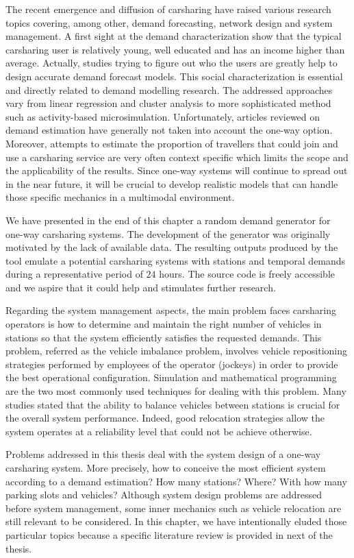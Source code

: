 \medskip
The recent emergence and diffusion of carsharing have raised various research topics covering, among other, demand forecasting, network design and system management.
A first sight at the demand characterization show that the typical carsharing user is relatively young, well educated and has an income higher than average.
Actually, studies trying to figure out who the users are greatly help to design accurate demand forecast models.
This social characterization is essential and directly related to demand modelling research.
The addressed approaches vary from linear regression and cluster analysis to more sophisticated method such as activity-based microsimulation.
Unfortunately, articles reviewed on demand estimation have generally not taken into account the one-way option.
Moreover, attempts to estimate the proportion of travellers that could join and use a carsharing service are very often context specific which limits the scope and the applicability of the results.
Since one-way systems will continue to spread out in the near future, it will be crucial to develop realistic models that can handle those specific mechanics in a multimodal environment.


\medskip
We have presented in the end of this chapter a random demand generator for one-way carsharing systems.
The development of the generator was originally motivated by the lack of available data.
The resulting outputs produced by the tool emulate a potential carsharing systems with stations and temporal demands during a representative period of $24$ hours.
The source code is freely accessible \cite{csgen} and we aspire that it could help and stimulates further research.


\medskip
Regarding the system management aspects, the main problem faces carsharing operators is how to determine and maintain the right number of vehicles in stations so that the system efficiently satisfies the requested demands.
This problem, referred as the vehicle imbalance problem, involves vehicle repositioning strategies performed by employees of the operator (jockeys) in order to provide the best operational configuration.
Simulation and mathematical programming are the two most commonly used techniques for dealing with this problem.
Many studies stated that the ability to balance vehicles between stations is crucial for the overall system performance.
Indeed, good relocation strategies allow the system operates at a reliability level that could not be achieve otherwise.


\medskip
Problems addressed in this thesis deal with the system design of a one-way carsharing system.
More precisely, how to conceive the most efficient system according to a demand estimation?
How many stations?
Where?
With how many parking slots and vehicles?
Although system design problems are addressed before system management, some inner mechanics such as vehicle relocation are still relevant to be considered.
In this chapter, we have intentionally eluded those particular topics because a specific literature review is provided in next of the thesis.

